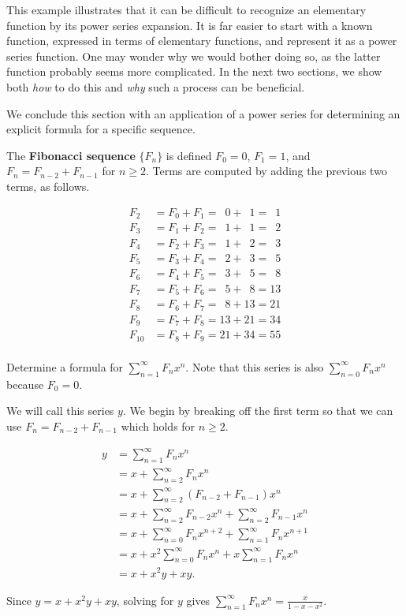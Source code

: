 This example illustrates that it can be difficult to recognize an elementary function by its power series expansion. It is far easier to start with a known function, expressed in terms of elementary functions, and represent it as a power series function. One may wonder why we would bother doing so, as the latter function probably seems more complicated. In the next two sections, we show both \emph{how} to do this and  \emph{why} such a process can be beneficial.

We conclude this section with an application of a power series for determining an explicit formula for a specific sequence.\\

{The \textbf{Fibonacci sequence} $\{F_n\}$ is defined $F_0=0$, $F_1=1$, and $F_n=F_{n-2}+F_{n-1}$ for $n\geq2$.  Terms are computed by adding the previous two terms, as follows.

\begin{align*}
F_2 &= F_0+F_1 =\phantom{1}0+\phantom{1}1 =\phantom{1}1\\
F_3 &= F_1+F_2 =\phantom{1}1+\phantom{1}1 =\phantom{1}2\\
F_4 &= F_2+F_3 =\phantom{1}1+\phantom{1}2 =\phantom{1}3\\
F_5 &= F_3+F_4 =\phantom{1}2+\phantom{1}3 =\phantom{1}5\\
F_6 &= F_4+F_5 =\phantom{1}3+\phantom{1}5 =\phantom{1}8\\
F_7 &= F_5+F_6 =\phantom{1}5+\phantom{1}8 =13\\
F_8 &= F_6+F_7 =\phantom{1}8+13 =21\\
F_9 &= F_7+F_8 =13+21 =34\\
F_{10} &= F_8+F_9 =21+34 =55\\
\end{align*}

Determine a formula for $\sum\limits_{n=1}^\infty F_n x^n$.  Note that this series is also $\sum\limits_{n=0}^\infty F_n x^n$ because $F_0=0$.
}
{We will call this series $y$.  We begin by breaking off the first term so that we can use $F_n=F_{n-2}+F_{n-1}$ which holds for $n\geq2$.

\begin{align*}
y &=\sum_{n=1}^\infty F_n x^n\\
&=x+ \sum_{n=2}^\infty F_n x^n\\
&=x+ \sum_{n=2}^\infty(F_{n-2} + F_{n-1}) x^n\\
&=x+ \sum_{n=2}^\infty F_{n-2} x^n + \sum_{n=2}^\infty F_{n-1} x^n\\
&=x+ \sum_{n=0}^\infty F_n x^{n+2} + \sum_{n=1}^\infty F_n x^{n+1}\\
&=x+ x^2 \sum_{n=0}^\infty F_n x^n + x \sum_{n=1}^\infty F_n x^n\\
&=x+ x^2y+xy.
\end{align*}

Since $y=x+x^2y+xy$, solving for $y$ gives $\sum\limits_{n=1}^\infty F_n x^n = \frac{x}{1-x-x^2}$.
}\\



